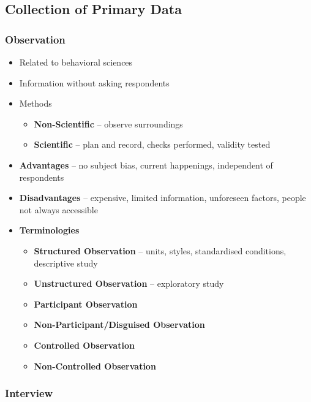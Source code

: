 \documentclass{article}
\begin{document}
\subsection{Collection of Primary Data}

\subsubsection{Observation}

\begin{itemize}
    \item Related to behavioral sciences
    \item Information without asking respondents
    \item Methods
    \begin{itemize}
        \item \textbf{Non-Scientific} -- observe surroundings
        \item \textbf{Scientific} -- plan and record, checks performed, validity tested
    \end{itemize}
    \item \textbf{Advantages} -- no subject bias, current happenings, independent of respondents
    \item \textbf{Disadvantages} -- expensive, limited information, unforeseen factors, people not always accessible
    \item \textbf{Terminologies}
    \begin{itemize}
        \item \textbf{Structured Observation} -- units, styles, standardised conditions, descriptive study
        \item \textbf{Unstructured Observation} -- exploratory study
        \item \textbf{Participant Observation}
        \item \textbf{Non-Participant/Disguised Observation}
        \item \textbf{Controlled Observation}
        \item \textbf{Non-Controlled Observation}
    \end{itemize}
\end{itemize}

\subsubsection{Interview}
\end{document}
